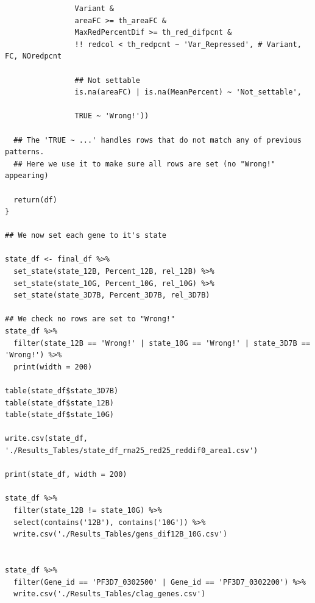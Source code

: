 \documentclass[11pt]{article}
\begin{document}
\begin{verbatim}
                Variant &
                areaFC >= th_areaFC &
                MaxRedPercentDif >= th_red_difpcnt &
                !! redcol < th_redpcnt ~ 'Var_Repressed', # Variant, FC, NOredpcnt

                ## Not settable
                is.na(areaFC) | is.na(MeanPercent) ~ 'Not_settable',

                TRUE ~ 'Wrong!'))

  ## The 'TRUE ~ ...' handles rows that do not match any of previous patterns.
  ## Here we use it to make sure all rows are set (no "Wrong!" appearing)

  return(df)
}

## We now set each gene to it's state

state_df <- final_df %>%
  set_state(state_12B, Percent_12B, rel_12B) %>%
  set_state(state_10G, Percent_10G, rel_10G) %>%
  set_state(state_3D7B, Percent_3D7B, rel_3D7B)

## We check no rows are set to "Wrong!"
state_df %>%
  filter(state_12B == 'Wrong!' | state_10G == 'Wrong!' | state_3D7B == 'Wrong!') %>%
  print(width = 200)

table(state_df$state_3D7B)
table(state_df$state_12B)
table(state_df$state_10G)

write.csv(state_df, './Results_Tables/state_df_rna25_red25_reddif0_area1.csv')

print(state_df, width = 200)

state_df %>%
  filter(state_12B != state_10G) %>%
  select(contains('12B'), contains('10G')) %>%
  write.csv('./Results_Tables/gens_dif12B_10G.csv')


state_df %>%
  filter(Gene_id == 'PF3D7_0302500' | Gene_id == 'PF3D7_0302200') %>%
  write.csv('./Results_Tables/clag_genes.csv')
\end{verbatim}
\end{document}
